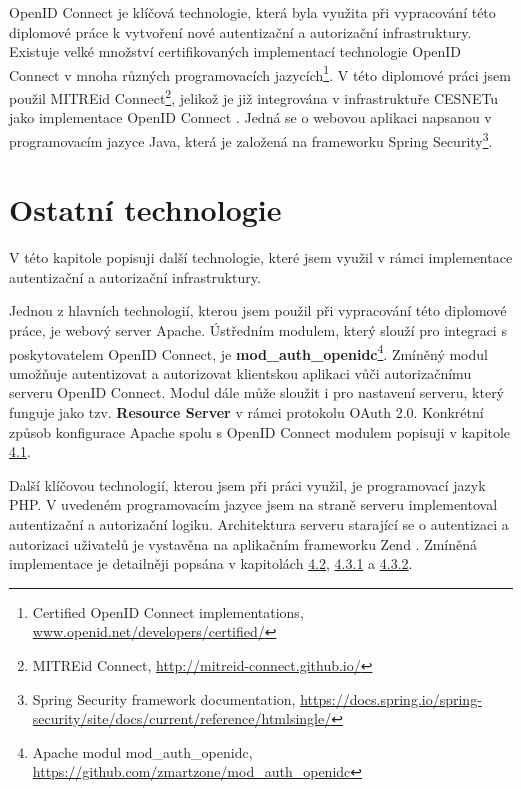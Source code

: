 \documentclass[
  printed, %
  twoside, %
  table,   %
  nolof,     %
  nolot,     %
]{fithesis3}
\begin{document}
\par
OpenID Connect je klíčová technologie, která byla využita při vypracování této diplomové práce k vytvoření nové autentizační a autorizační infrastruktury. Existuje velké množství certifikovaných implementací technologie OpenID Connect v mnoha různých programovacích jazycích\footnote{Certified OpenID Connect implementations, \url{www.openid.net/developers/certified/}}. V této diplomové práci jsem použil MITREid Connect\footnote{MITREid Connect, \url{http://mitreid-connect.github.io/}}, jelikož je již integrována v infrastruktuře CESNETu jako implementace OpenID Connect \cite{oidcPresentation}. Jedná se o webovou aplikaci napsanou v programovacím jazyce Java, která je založená na frameworku Spring Security\footnote{Spring Security framework documentation, \url{https://docs.spring.io/spring-security/site/docs/current/reference/htmlsingle/}}. 

\section{Ostatní technologie}
V této kapitole popisuji další technologie, které jsem využil v rámci implementace autentizační a autorizační infrastruktury. 
\par
Jednou z hlavních technologií, kterou jsem použil při vypracování této diplomové práce, je webový server Apache. Ústředním modulem, který slouží pro integraci s poskytovatelem OpenID Connect, je \textbf{mod\_auth\_openidc}\footnote{Apache modul mod\_auth\_openidc, \url{https://github.com/zmartzone/mod\_auth\_openidc}}. Zmíněný modul umožňuje autentizovat a autorizovat klientskou aplikaci vůči autorizačnímu serveru OpenID Connect. Modul dále může sloužit i pro nastavení serveru, který funguje jako tzv. \textbf{Resource Server} v rámci protokolu OAuth 2.0. Konkrétní způsob konfigurace Apache spolu s OpenID Connect modulem popisuji v kapitole \hyperref[apacheConfig]{4.1}.

\par
Další klíčovou technologií, kterou jsem při práci využil, je programovací jazyk PHP. V uvedeném programovacím jazyce jsem na straně serveru  implementoval autentizační a autorizační logiku. Architektura serveru  starající se o autentizaci a autorizaci uživatelů je vystavěna na aplikačním frameworku Zend \cite{zend}. Zmíněná implementace je detailněji popsána v kapitolách \hyperref[ACImpl]{4.2}, \hyperref[ShongoImpl-authn]{4.3.1} a \hyperref[ShongoImpl-authr]{4.3.2}. 
\end{document}
